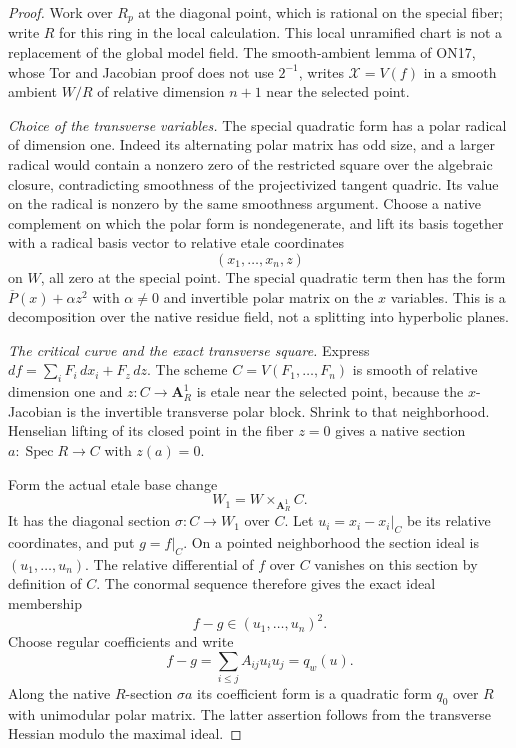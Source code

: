 \begin{proof}
Work over $R_p$ at the diagonal point, which is rational
on the special fiber; write $R$ for this ring in the
local calculation. This local unramified chart is not
a replacement of the global model field.
The smooth-ambient lemma of ON17, whose Tor and
Jacobian proof does not use $2^{-1}$, writes
$\mathcal X=V(f)$ in a smooth ambient $W/R$ of relative
dimension $n+1$ near the selected point.

\emph{Choice of the transverse variables.}
The special quadratic form has a polar radical of
dimension one. Indeed its alternating polar matrix
has odd size, and a larger radical would contain a
nonzero zero of the restricted square over the algebraic
closure, contradicting smoothness of the projectivized
tangent quadric. Its value on the radical is nonzero
by the same smoothness argument.
Choose a native complement on which the polar form is
nondegenerate, and lift its basis together with a radical
basis vector to relative etale coordinates
\[
                              (x_1,\ldots,x_n,z)
\]
on $W$, all zero at the special point. The special
quadratic term then has the form
$\overline P(x)+\alpha z^2$ with
$\alpha\ne0$ and invertible polar matrix on the $x$
variables. This is a decomposition over the native
residue field, not a splitting into hyperbolic planes.

\emph{The critical curve and the exact transverse square.}
Express
$df=\sum_i F_i\,dx_i+F_z\,dz$.
The scheme $C=V(F_1,\ldots,F_n)$ is smooth of relative
dimension one and $z:C\to\mathbf A^1_R$ is etale near
the selected point, because the $x$-Jacobian is the
invertible transverse polar block. Shrink to that
neighborhood. Henselian lifting of its closed point
in the fiber $z=0$ gives a native section
$a:\operatorname{Spec}R\to C$ with $z(a)=0$.

Form the actual etale base change
\[
                         W_1=W\times_{\mathbf A^1_R}C.
\]
It has the diagonal section $\sigma:C\to W_1$ over $C$.
Let $u_i=x_i-x_i|_C$ be its relative coordinates, and
put $g=f|_C$. On a pointed neighborhood the section
ideal is $(u_1,\ldots,u_n)$. The relative differential
of $f$ over $C$ vanishes on this section by definition
of $C$. The conormal sequence therefore gives the exact
ideal membership
\[
                    f-g\in(u_1,\ldots,u_n)^2.
\]
Choose regular coefficients and write
\[
               f-g=\sum_{i\le j}A_{ij}u_iu_j=q_w(u).
 \tag{NF217.4}\label{r17nf:transverse-form}
\]
Along the native $R$-section $\sigma a$ its coefficient
form is a quadratic form $q_0$ over $R$ with unimodular
polar matrix. The latter assertion follows from the
transverse Hessian modulo the maximal ideal.


\end{proof}

